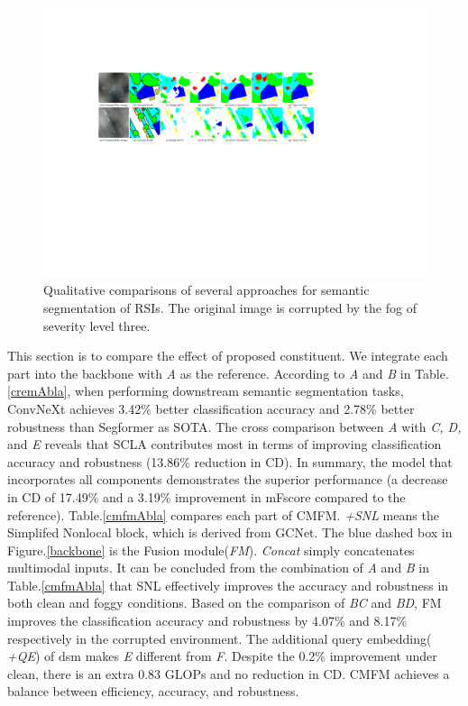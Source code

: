 \documentclass[lettersize,journal]{IEEEtran}
\begin{document}
\begin{figure}[!htbp]
    \centering
    \includegraphics[width=\textwidth]{visualResult.pdf}
    \caption{Qualitative comparisons of several approaches for semantic segmentation of RSIs. The original image is corrupted by the fog of severity level three.
    }
    \label{visualResult}
\end{figure}
This section is to compare the effect of proposed constituent. We integrate each part into the backbone with \emph{A} as the reference. According to \emph{A} and \emph{B} in Table.\ref{cremAbla}, when performing downstream semantic segmentation tasks, ConvNeXt achieves 3.42\% better classification accuracy and 2.78\% better robustness than Segformer\cite{xieSegFormerSimpleEfficient2021} as SOTA. The cross comparison between \emph{A} with \emph{C, D,} and \emph{E} reveals that SCLA contributes most in terms of improving classification accuracy and robustness (13.86\% reduction in CD). In summary, the model that incorporates all components demonstrates the superior performance (a decrease in CD of 17.49\% and a 3.19\% improvement in mFscore compared to the reference). Table.\ref{cmfmAbla} compares each part of CMFM.  \emph{+SNL} means the Simplifed Nonlocal block, which is derived from GCNet\cite{caoGCNetNonlocalNetworks2019}. The blue dashed box in  Figure.\ref{backbone} is the Fusion module(\emph{FM}).  \emph{Concat} simply concatenates multimodal inputs. It can be concluded from the combination of \emph{A } and \emph{B} in Table.\ref{cmfmAbla} that SNL effectively improves the accuracy and robustness in both clean and foggy conditions. Based on the comparison of \emph{BC} and \emph{BD}, FM improves the classification accuracy and robustness by 4.07\% and 8.17\% respectively in the corrupted environment. The additional query embedding( \emph{+QE}) of dsm makes \emph{E} different from \emph{F}. Despite the 0.2\% improvement under clean, there is an extra 0.83 GLOPs and no reduction in CD. CMFM achieves a balance between efficiency, accuracy, and robustness. 
\end{document}
